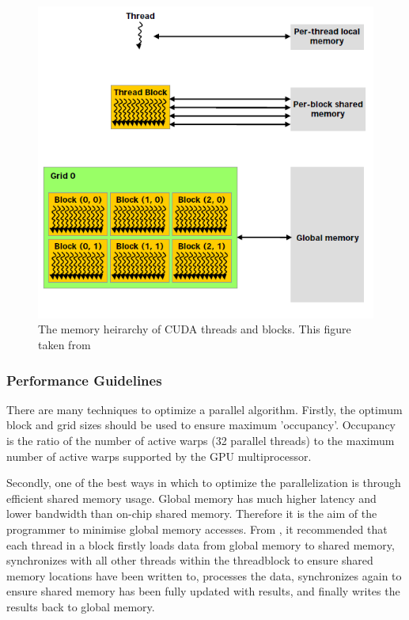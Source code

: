 \begin{figure}[p]
	\centering
		\includegraphics[scale=0.4]{images/cudamemory.PNG}
		\caption{The memory heirarchy of CUDA threads and blocks. This figure taken from \cite{cuda}}
	\label{fig:cudamemory}
\end{figure}

		\subsubsection{Performance Guidelines}
There are many techniques to optimize a parallel algorithm. Firstly, the optimum block and grid sizes should be used to ensure maximum 'occupancy'. Occupancy is the ratio of the number of active warps (32 parallel threads) to the maximum number of active warps supported by the GPU multiprocessor. 

Secondly, one of the best ways in which to optimize the parallelization is through efficient shared memory usage. Global memory has much higher latency and lower bandwidth than on-chip shared memory. Therefore it is the aim of the programmer to minimise global memory accesses. From \cite{cuda}, it recommended that each thread in a block firstly loads data from global memory to shared memory, synchronizes with all other threads within the threadblock to ensure shared memory locations have been written to, processes the data, synchronizes again to ensure shared memory has been fully updated with results, and finally writes the results back to global memory.
